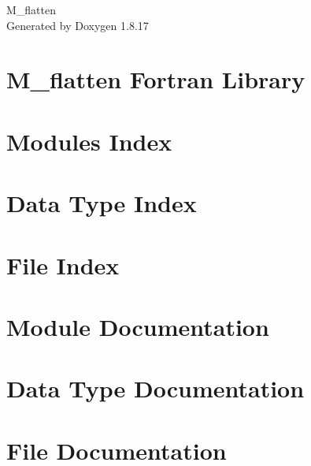 \let\mypdfximage\pdfximage\def\pdfximage{\immediate\mypdfximage}\documentclass[twoside]{book}
\newcommand{\+}{\discretionary{\mbox{\scriptsize$\hookleftarrow$}}{}{}}
\newcommand{\clearemptydoublepage}{%
  \newpage{\pagestyle{empty}\cleardoublepage}%
}
\begin{document}
\hypersetup{pageanchor=false,
             bookmarksnumbered=true,
             pdfencoding=unicode
            }
\begin{titlepage}
\vspace*{7cm}
\begin{center}%
{\Large M\+\_\+flatten }\\
\vspace*{1cm}
{\large Generated by Doxygen 1.8.17}\\
\end{center}
\end{titlepage}
\clearemptydoublepage
{}
\tableofcontents
\clearemptydoublepage
{}
\hypersetup{pageanchor=true}

\chapter{M\+\_\+flatten Fortran Library}
\label{index}\hypertarget{index}{}
\chapter{Modules Index}

\chapter{Data Type Index}

\chapter{File Index}

\chapter{Module Documentation}

\chapter{Data Type Documentation}

\chapter{File Documentation}




\backmatter
\newpage
{}
\clearemptydoublepage
{}
\printindex
\end{document}
